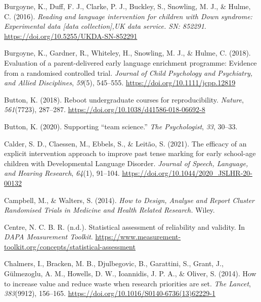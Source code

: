 \documentclass{krantz}
\newlength{\cslhangindent}
\newlength{\cslentryspacingunit} %
\newenvironment{CSLReferences}[2] %
{%
\setlength{\parindent}{0pt}
\ifodd #1
\let\oldpar\par
\def\par{\hangindent=\cslhangindent\oldpar}
\fi
\setlength{\parskip}{#2\cslentryspacingunit}
}%
{}
\begin{document}
\begin{CSLReferences}{1}{0}
\leavevmode{}%
Burgoyne, K., Duff, F. J., Clarke, P. J., Buckley, S., Snowling, M. J., \& Hulme, C. (2016). \emph{Reading and language intervention for children with {Down} syndrome: {Experimental} data {[}data collection{]},UK data service. SN: 852291}. \url{https://doi.org/10.5255/UKDA-SN-852291}

\leavevmode{}%
Burgoyne, K., Gardner, R., Whiteley, H., Snowling, M. J., \& Hulme, C. (2018). Evaluation of a parent-delivered early language enrichment programme: Evidence from a randomised controlled trial. \emph{Journal of Child Psychology and Psychiatry, and Allied Disciplines}, \emph{59}(5), 545--555. \url{https://doi.org/10.1111/jcpp.12819}

\leavevmode{}%
Button, K. (2018). Reboot undergraduate courses for reproducibility. \emph{Nature}, \emph{561}(7723), 287--287. \url{https://doi.org/10.1038/d41586-018-06692-8}

\leavevmode{}%
Button, K. (2020). Supporting {``team science.''} \emph{The Psychologist}, \emph{33}, 30--33.

\leavevmode{}%
Calder, S. D., Claessen, M., Ebbels, S., \& Leitão, S. (2021). The efficacy of an explicit intervention approach to improve past tense marking for early school-age children with {Developmental Language Disorder}. \emph{Journal of Speech, Language, and Hearing Research}, \emph{64}(1), 91--104. \url{https://doi.org/10.1044/2020_JSLHR-20-00132}

\leavevmode{}%
Campbell, M., \& Walters, S. (2014). \emph{How to {Design}, {Analyse} and {Report Cluster Randomised Trials} in {Medicine} and {Health Related Research}.} {Wiley}.

\leavevmode{}%
Centre, N. C. B. R. (n.d.). Statistical assessment of reliability and validity. In \emph{DAPA Measurement Toolkit}. \url{https://www.measurement-toolkit.org/concepts/statistical-assessment}

\leavevmode{}%
Chalmers, I., Bracken, M. B., Djulbegovic, B., Garattini, S., Grant, J., Gülmezoglu, A. M., Howells, D. W., Ioannidis, J. P. A., \& Oliver, S. (2014). How to increase value and reduce waste when research priorities are set. \emph{The Lancet}, \emph{383}(9912), 156--165. \url{https://doi.org/10.1016/S0140-6736(13)62229-1}


\end{CSLReferences}
\end{document}
